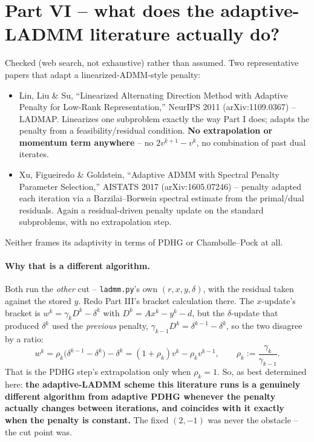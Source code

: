 \documentclass[11pt]{article}
\newcommand{\code}[1]{\texttt{#1}}
\begin{document}
\section*{Part VI -- what does the adaptive-LADMM literature actually do?}
Checked (web search, not exhaustive) rather than assumed. Two representative
papers that adapt a linearized-ADMM-style penalty:
\begin{itemize}
\item Lin, Liu \& Su, ``Linearized Alternating Direction Method with Adaptive
Penalty for Low-Rank Representation,'' NeurIPS 2011 (arXiv:1109.0367) -- LADMAP.
Linearizes one subproblem exactly the way Part I does; adapts the penalty from a
feasibility/residual condition. \textbf{No extrapolation or momentum term
anywhere} -- no $2v^{k+1}-v^k$, no combination of past dual iterates.
\item Xu, Figueiredo \& Goldstein, ``Adaptive ADMM with Spectral Penalty
Parameter Selection,'' AISTATS 2017 (arXiv:1605.07246) -- penalty adapted each
iteration via a Barzilai--Borwein spectral estimate from the primal/dual
residuals. Again a residual-driven penalty update on the standard subproblems,
with no extrapolation step.
\end{itemize}
Neither frames its adaptivity in terms of PDHG or Chambolle--Pock at all.

\paragraph{Why that is a different algorithm.} Both run the \emph{other} cut --
\code{ladmm.py}'s own $(r,x,y,\delta)$, with the residual taken against the stored
$y$. Redo Part III's bracket calculation there. The $x$-update's bracket is
$w^k=\gamma_kD^k-\delta^k$ with $D^k=Ax^k-y^k-d$, but the $\delta$-update that
produced $\delta^k$ used the \emph{previous} penalty,
$\gamma_{k-1}D^{k}=\delta^{k-1}-\delta^{k}$, so the two disagree by a ratio:
\[
w^k=\rho_k\big(\delta^{k-1}-\delta^k\big)-\delta^k
=(1+\rho_k)v^k-\rho_kv^{k-1},\qquad \rho_k:=\frac{\gamma_k}{\gamma_{k-1}}.
\]
That is the PDHG step's extrapolation only when $\rho_k=1$. So, as best determined
here: \textbf{the adaptive-LADMM scheme this literature runs is a genuinely
different algorithm from adaptive PDHG whenever the penalty actually changes
between iterations, and coincides with it exactly when the penalty is constant.}
The fixed $(2,-1)$ was never the obstacle -- the cut point was.
\end{document}

